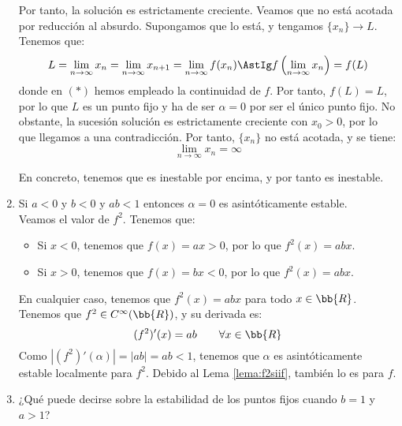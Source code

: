 \begin{ejercicio}
\begin{enumerate}
        Por tanto, la solución es estrictamente creciente. Veamos que no está acotada por reducción al absurdo. Supongamos que lo está, y tengamos $\{x_n\}\to L$. Tenemos que:
        \begin{equation*}
            L = \lim_{n\to \infty} x_n = \lim_{n\to \infty} x_{n+1} 
            = \lim_{n\to \infty} f(x_n) \AstIg f\left(\lim_{n\to \infty} x_n\right) = f(L)
        \end{equation*}
        donde en $(\ast)$ hemos empleado la continuidad de $f$. Por tanto, $f(L)=L$, por lo que $L$ es un punto fijo y ha de ser $\alpha=0$ por ser el único punto fijo. No obstante, la sucesión solución es estrictamente creciente con $x_0>0$, por lo que llegamos a una contradicción.
        Por tanto, $\{x_n\}$ no está acotada, y se tiene:
        \begin{equation*}
            \lim_{n\to \infty}x_n = \infty
        \end{equation*}

        En concreto, tenemos que es inestable por encima, y por tanto es inestable.
        
        \item Si $a < 0$ y $b < 0$ y $ab < 1$ entonces $\alpha = 0$ es asintóticamente estable.\\

        Veamos el valor de $f^2$. Tenemos que:
        \begin{itemize}
            \item Si $x<0$, tenemos que $f(x)=ax>0$, por lo que $f^2(x)=abx$.\\
            \item Si $x>0$, tenemos que $f(x)=bx<0$, por lo que $f^2(x)=abx$.\\
        \end{itemize}

        En cualquier caso, tenemos que $f^2(x)=abx$ para todo $x\in \bb{R}$. Tenemos que $f^2\in C^\infty(\bb{R})$, y su derivada es:
        \begin{equation*}
            (f^2)'(x) = ab \qquad \forall x\in \bb{R}
        \end{equation*}
        Como $|(f^2)'(\alpha)|=|ab|=ab<1$, tenemos que $\alpha$ es asintóticamente estable localmente para $f^2$. Debido al Lema \ref{lema:f2siif}, también lo es para $f$.
        
        \item ¿Qué puede decirse sobre la estabilidad de los puntos fijos cuando $b = 1$ y $a > 1$?


\end{enumerate}
\end{ejercicio}
